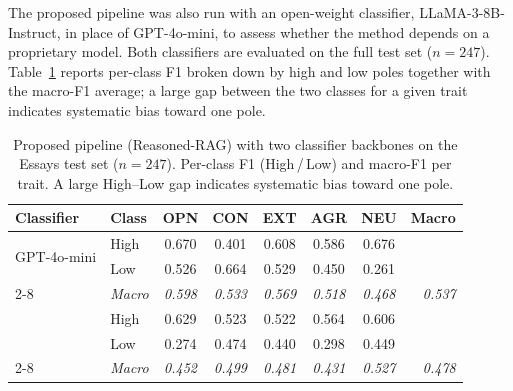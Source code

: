 \documentclass[../main.tex]{subfiles}
\begin{document}
The proposed pipeline was also run with an open-weight classifier,
LLaMA-3-8B-Instruct, in place of GPT-4o-mini, to assess whether the method
depends on a proprietary model. Both classifiers are evaluated on the full
test set ($n=247$). Table~\ref{tab:model-comparison} reports per-class F1
broken down by high and low poles together with the macro-F1 average; a
large gap between the two classes for a given trait indicates systematic
bias toward one pole.

\begin{table}[htbp]
  \centering
  \caption{Proposed pipeline (Reasoned-RAG) with two classifier backbones on
    the Essays test set ($n=247$). Per-class F1 (High\,/\,Low) and macro-F1
    per trait. A large High--Low gap indicates systematic bias toward one pole.}
  \label{tab:model-comparison}
  \small
  \begin{tabular}{llcccccr}
    \toprule
    \textbf{Classifier} & \textbf{Class}
      & \textbf{OPN} & \textbf{CON} & \textbf{EXT}
      & \textbf{AGR} & \textbf{NEU} & \textbf{Macro} \\
    \midrule
    \multirow{2}{*}{\mbox{GPT-4o-mini}}
      & High & 0.670 & 0.401 & 0.608 & 0.586 & 0.676 & \\
      & Low  & 0.526 & 0.664 & 0.529 & 0.450 & 0.261 & \\
    \cmidrule(lr){2-8}
      & \textit{Macro} & \textit{0.598} & \textit{0.533} & \textit{0.569} & \textit{0.518} & \textit{0.468} & \textit{0.537} \\
    \addlinespace
    \multirow{2}{*}{\mbox{LLaMA-3-8B}} %
      & High & 0.629 & 0.523 & 0.522 & 0.564 & 0.606 & \\
      & Low  & 0.274 & 0.474 & 0.440 & 0.298 & 0.449 & \\
    \cmidrule(lr){2-8}
      & \textit{Macro} & \textit{0.452} & \textit{0.499} & \textit{0.481} & \textit{0.431} & \textit{0.527} & \textit{0.478} \\
    \bottomrule
  \end{tabular}
\end{table}
\end{document}
